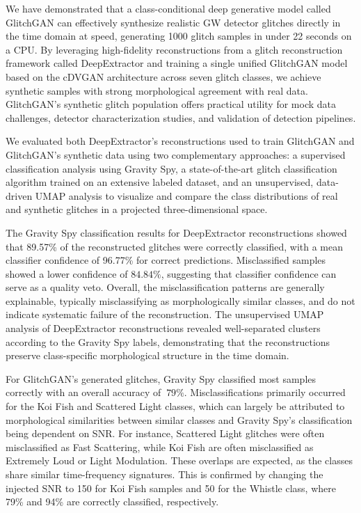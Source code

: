 \documentclass[reprint,nofootinbib,amsmath,amssymb,aps,floatfix]{revtex4-2}
\begin{document}
We have demonstrated that a class-conditional deep generative model called GlitchGAN can effectively synthesize realistic GW detector glitches directly in the time domain at speed, generating 1000 glitch samples in under 22 seconds on a CPU.
By leveraging high-fidelity reconstructions from a glitch reconstruction framework called DeepExtractor and training a single unified GlitchGAN model based on the cDVGAN architecture across seven glitch classes, we achieve synthetic samples with strong morphological agreement with real data.
GlitchGAN's synthetic glitch population offers practical utility for mock data challenges, detector characterization studies, and validation of detection pipelines.

We evaluated both DeepExtractor's reconstructions used to train GlitchGAN and GlitchGAN's synthetic data using two complementary approaches: a supervised classification analysis using Gravity Spy, a state-of-the-art glitch classification algorithm trained on an extensive labeled dataset, and an unsupervised, data-driven UMAP analysis to visualize and compare the class distributions of real and synthetic glitches in a projected three-dimensional space.

The Gravity Spy classification results for DeepExtractor reconstructions showed that 89.57\% of the reconstructed glitches were correctly classified, with a mean classifier confidence of 96.77\% for correct predictions.
Misclassified samples showed a lower confidence of $84.84\%$, suggesting that classifier confidence can serve as a quality veto.
Overall, the misclassification patterns are generally explainable, typically misclassifying as morphologically similar classes, and do not indicate systematic failure of the reconstruction.
The unsupervised UMAP analysis of DeepExtractor reconstructions revealed well-separated clusters according to the Gravity Spy labels, demonstrating that the reconstructions preserve class-specific morphological structure in the time domain.

For GlitchGAN's generated glitches, Gravity Spy classified most samples correctly with an overall accuracy of $~79\%$.
Misclassifications primarily occurred for the Koi Fish and Scattered Light classes, which can largely be attributed to morphological similarities between similar classes and Gravity Spy's classification being dependent on SNR.
For instance, Scattered Light glitches were often misclassified as Fast Scattering, while Koi Fish are often misclassified as Extremely Loud or Light Modulation.
These overlaps are expected, as the classes share similar time-frequency signatures.
This is confirmed by changing the injected SNR to 150 for Koi Fish samples and 50 for the Whistle class, where 79\% and 94\% are correctly classified, respectively.
\end{document}
